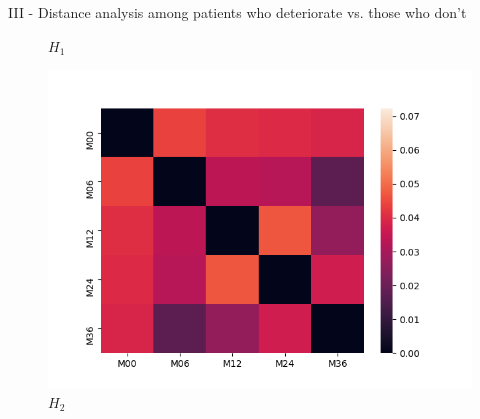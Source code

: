 \documentclass[aspectratio=169, 10pt, dvipsnames]{beamer}
\begin{document}
\begin{frame}[fragile]{III - Distance analysis among patients who deteriorate vs. those who don't}
\begin{figure}
    \caption{$H_1$}
  \end{figure}
  \endminipage
  \hfill
  \begin{figure}
    \centering
     \includegraphics[width=\textwidth]{figures/temporal_evolution/ADNI011S0023_h_2.png}
    \caption{$H_2$}
  \end{figure}
  \endminipage
\end{frame}
\end{document}
